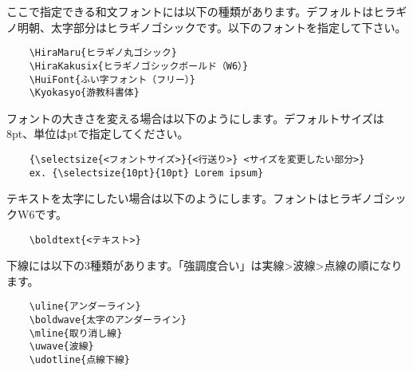 \begin{multicols*}{2}
ここで指定できる和文フォントには以下の種類があります。デフォルトはヒラギノ明朝、太字部分はヒラギノゴシックです。以下のフォントを指定して下さい。
\begin{verbatim}
    \HiraMaru{ヒラギノ丸ゴシック}
    \HiraKakusix{ヒラギノゴシックボールド（W6）}
    \HuiFont{ふい字フォント（フリー）}
    \Kyokasyo{游教科書体}
\end{verbatim}

フォントの大きさを変える場合は以下のようにします。デフォルトサイズは8pt、単位はptで指定してください。

\begin{verbatim}
    {\selectsize{<フォントサイズ>}{<行送り>} <サイズを変更したい部分>}
    ex. {\selectsize{10pt}{10pt} Lorem ipsum}
\end{verbatim}

テキストを太字にしたい場合は以下のようにします。フォントはヒラギノゴシックW6です。
\begin{verbatim}
    \boldtext{<テキスト>}
\end{verbatim}

下線には以下の3種類があります。「強調度合い」は実線>波線>点線の順になります。
\begin{verbatim}
    \uline{アンダーライン}
    \boldwave{太字のアンダーライン}
    \mline{取り消し線}
    \uwave{波線}
    \udotline{点線下線}
\end{verbatim}
\begin{comment}
\point*[running head]{圏点・ルビ}
    \point{圏点とルビ}
    \indent 以下のようにして文字の上に点を振って強調したり、ルビを振ったりすることができます。ルビを振る際は漢字ごとに|で区切って指定してください。
    \begin{verbatim}
        ...。\kenten{文字の上に点が！
        ...\ltjruby{九|去|法}{きゅう|きょ|ほう}...
    \end{verbatim}
    
    \point{URL}
    \indent 以下のように囲ってください。ただしURLを貼るときは、基本的に後述の「Footnote」内に書くと共に、
    QRコードの画像を回り込み等で挿入しておくのが良いでしょう。
    \begin{verbatim}
        \url{https://www.apple.com/}
    \end{verbatim}
    
    \point{キーワードテキスト}
    \indent キーワード等を大きく強調したい場合は、後述の「KEY枠囲み」の中にこれを指定します。
    \begin{verbatim}
        \begin{framebox-key}
            \keywordtext{キーワード強調}
            説明ごちゃごちゃ...
        \end{framebox-key}
    \end{verbatim}
    

\end{comment}
\end{multicols*}
